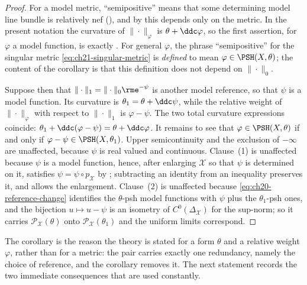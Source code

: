 \begin{proof}
For a model metric, ``semipositive'' means that some determining model line
bundle is relatively nef (), and by
 this depends only on the metric.  In the
present notation the curvature of \(\|\cdot\|_\varphi\) is
\(\theta+\ddc\varphi\), so the first assertion, for \(\varphi\) a model
function, is exactly .  For general
\(\varphi\), the phrase ``semipositive'' for the singular metric
\eqref{eq:ch21-singular-metric} is \emph{defined} to mean
\(\varphi\in\PSH(X,\theta)\); the content of the corollary is that this
definition does not depend on \(\|\cdot\|_0\).

Suppose then that \(\|\cdot\|_1=\|\cdot\|_0\rme^{-\psi}\) is another model
reference, so that \(\psi\) is a model function.  Its curvature is
\(\theta_1=\theta+\ddc\psi\), while the relative weight of
\(\|\cdot\|_\varphi\) with respect to \(\|\cdot\|_1\) is
\(\varphi-\psi\).  The two total curvature expressions coincide:
\(\theta_1+\ddc(\varphi-\psi)=\theta+\ddc\varphi\).  It remains to see that
\(\varphi\in\PSH(X,\theta)\) if and only if
\(\varphi-\psi\in\PSH(X,\theta_1)\).  Upper semicontinuity and the exclusion
of \(-\infty\) are unaffected, because \(\psi\) is real valued and
continuous.  Clause~(1) is unaffected because \(\psi\) is a model function,
hence, after enlarging \(\mathcal X\) so that \(\psi\) is determined on it,
satisfies \(\psi=\psi\circ p_{\mathcal X}\) by
; subtracting an identity from an inequality
preserves it, and  allows the
enlargement.  Clause~(2) is unaffected because
\eqref{eq:ch20-reference-change} identifies the \(\theta\)-psh model
functions with \(\psi\) plus the \(\theta_1\)-psh ones, and the bijection
\(u\mapsto u-\psi\) is an isometry of \(C^0(\Delta_{\mathcal X})\) for the
sup-norm; so it carries \(\mathcal P_{\mathcal X}(\theta)\) onto
\(\mathcal P_{\mathcal X}(\theta_1)\) and the uniform limits correspond.
\end{proof}

The corollary is the reason the theory is stated for a form \(\theta\) and a
relative weight \(\varphi\), rather than for a metric: the pair carries
exactly one redundancy, namely the choice of reference, and the corollary
removes it.  The next statement records the two immediate consequences that
are used constantly.

